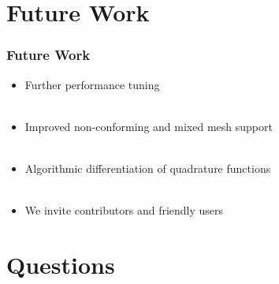 \documentclass{beamer}
\begin{document}
\section{Future Work}

\begin{frame}
\begin{center}
\frametitle{Future Work}

\begin{itemize}

\item Further performance tuning\\

~\\

\item Improved non-conforming and mixed mesh support\\

~\\

\item Algorithmic differentiation of quadrature functions\\

~\\

\item We invite contributors and friendly users

\end{itemize}

\end{center}
\end{frame}

\section{Questions}
\end{document}
